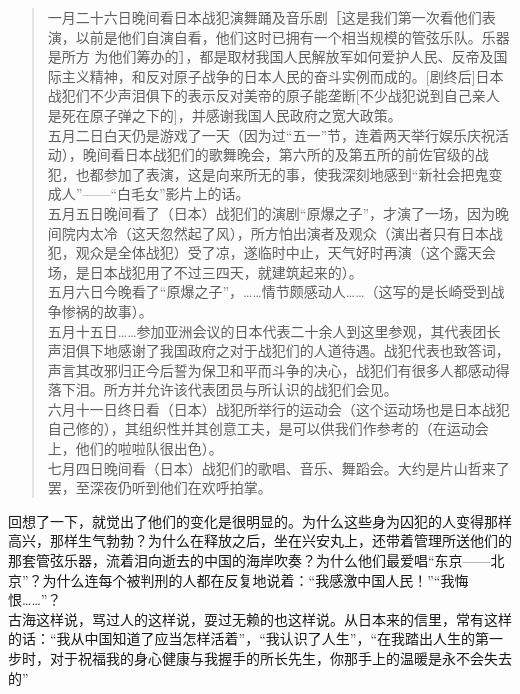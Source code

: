 \begin{quote}
	一月二十六日晚间看日本战犯演舞踊及音乐剧［这是我们第一次看他们表演，以前是他们自演自看，他们这时已拥有一个相当规模的管弦乐队。乐器是所方
为他们筹办的］，都是取材我国人民解放军如何爱护人民、反帝及国际主义精神，和反对原子战争的日本人民的奋斗实例而成的。[剧终后]日本战犯们不少声泪俱下的表示反对美帝的原子能垄断[不少战犯说到自己亲人是死在原子弹之下的]，并感谢我国人民政府之宽大政策。\\

五月二日白天仍是游戏了一天（因为过“五一”节，连着两天举行娱乐庆祝活动），晚间看日本战犯们的歌舞晚会，第六所的及第五所的前佐官级的战犯，也都参加了表演，这是向来所无的事，使我深刻地感到“新社会把鬼变成人”——“白毛女”影片上的话。\\

五月五日晚间看了（日本）战犯们的演剧“原爆之子”，才演了一场，因为晚间院内太冷（这天忽然起了风），所方怕出演者及观众（演出者只有日本战犯，观众是全体战犯）受了凉，遂临时中止，天气好时再演（这个露天会场，是日本战犯用了不过三四天，就建筑起来的）。\\

五月六日今晚看了“原爆之子”，……情节颇感动人……（这写的是长崎受到战争惨祸的故事）。\\

五月十五日……参加亚洲会议的日本代表二十余人到这里参观，其代表团长声泪俱下地感谢了我国政府之对于战犯们的人道待遇。战犯代表也致答词，声言其改邪归正今后誓为保卫和平而斗争的决心，战犯们有很多人都感动得落下泪。所方并允许该代表团员与所认识的战犯们会见。\\

六月十一日终日看（日本）战犯所举行的运动会（这个运动场也是日本战犯自己修的），其组织性并其创意工夫，是可以供我们作参考的（在运动会上，他们的啦啦队很出色）。\\

七月四日晚间看（日本）战犯们的歌唱、音乐、舞蹈会。大约是片山哲来了罢，至深夜仍听到他们在欢呼拍掌。\\
\end{quote}

回想了一下，就觉出了他们的变化是很明显的。为什么这些身为囚犯的人变得那样高兴，那样生气勃勃？为什么在释放之后，坐在兴安丸上，还带着管理所送他们的那套管弦乐器，流着泪向逝去的中国的海岸吹奏？为什么他们最爱唱“东京——北京”？为什么连每个被判刑的人都在反复地说着：“我感激中国人民！”“我悔恨……”？\\

古海这样说，骂过人的这样说，耍过无赖的也这样说。从日本来的信里，常有这样的话：“我从中国知道了应当怎样活着”，“我认识了人生”，“在我踏出人生的第一步时，对于祝福我的身心健康与我握手的所长先生，你那手上的温暖是永不会失去的”\\

